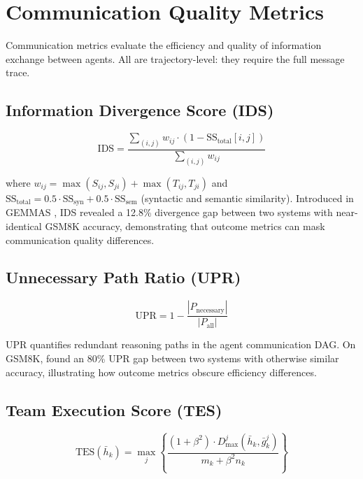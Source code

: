 \documentclass[11pt,a4paper]{article}
\begin{document}
\section{Communication Quality Metrics}
\label{sec:comm}

Communication metrics evaluate the efficiency and quality of information exchange
between agents. All are trajectory-level: they require the full message trace.

\subsection{Information Divergence Score (IDS)}

\begin{equation}
  \text{IDS} = \frac{\sum_{(i,j)} w_{ij}\cdot(1 - \text{SS}_{\text{total}}[i,j])}
                    {\sum_{(i,j)} w_{ij}}
\end{equation}

where $w_{ij} = \max(S_{ij}, S_{ji}) + \max(T_{ij}, T_{ji})$ and
$\text{SS}_{\text{total}} = 0.5 \cdot \text{SS}_{\text{syn}} + 0.5 \cdot
\text{SS}_{\text{sem}}$ (syntactic and semantic similarity). Introduced in
GEMMAS \citep{gemmas2025}, IDS revealed a 12.8\% divergence gap between two systems
with near-identical GSM8K accuracy, demonstrating that outcome metrics can mask
communication quality differences.

\subsection{Unnecessary Path Ratio (UPR)}

\begin{equation}
  \text{UPR} = 1 - \frac{|P_{\text{necessary}}|}{|P_{\text{all}}|}
\end{equation}

UPR quantifies redundant reasoning paths in the agent communication DAG. On GSM8K,
\citet{gemmas2025} found an 80\% UPR gap between two systems with otherwise similar
accuracy, illustrating how outcome metrics obscure efficiency differences.

\subsection{Team Execution Score (TES)}

\begin{equation}
  \text{TES}(\bar{h}_k) = \max_j \left\{
    \frac{(1+\beta^2) \cdot D_{\max}^j(\bar{h}_k, \bar{g}_k^j)}{m_k + \beta^2 n_k}
  \right\}
\end{equation}
\end{document}
